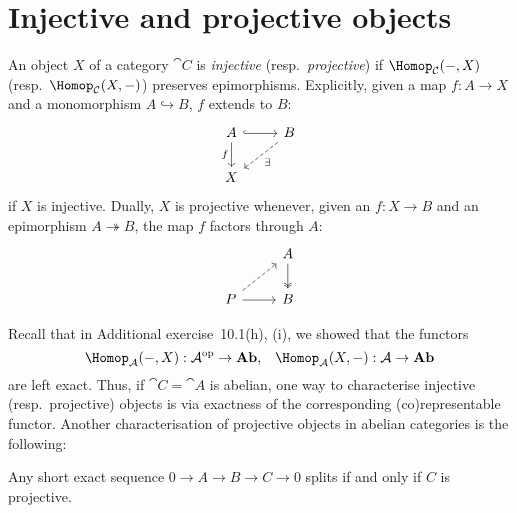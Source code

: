 \documentclass[../main.tex]{subfiles}
\begin{document}
\section{Injective and projective objects}

\begin{defn}
    An object \(X\) of a category \(\cat C\) is \emph{injective} (resp.~\emph{projective}) if $\Hom[\cat C](-, X)$ (resp.~$\Hom[\cat C](X,-)$) preserves epimorphisms. Explicitly, given a map $f\colon A\to X$ and a monomorphism $A\hookrightarrow B$, $f$ extends to $B$:
    \[\begin{tikzcd}
    	A & B \\
    	X
    	\arrow[hook, from=1-1, to=1-2]
    	\arrow["f"', from=1-1, to=2-1]
    	\arrow["\exists", dashed, from=1-2, to=2-1]
    \end{tikzcd}\] if $X$ is injective.
    Dually, $X$ is projective whenever, given an $f\colon X\to B$ and an epimorphism $A\twoheadrightarrow B$, the map $f$ factors through $A$:
    \[\begin{tikzcd}
    	& A \\
    	P & B
    	\arrow[two heads, from=1-2, to=2-2]
    	\arrow[dashed, from=2-1, to=1-2]
    	\arrow[from=2-1, to=2-2]
    \end{tikzcd}\]
\end{defn}

Recall that in Additional exercise~10.1(h), (i), we showed that the functors
\[\Hom[\cat A](-, X)\colon \cat A\opp \to \catAbelianGroup\text{,} \quad \Hom[\cat A](X, -)\colon \cat A\to \catAbelianGroup\]
are left exact.
Thus, if $\cat C = \cat A$ is abelian, one way to characterise injective (resp.~projective) objects is via exactness of the corresponding (co)representable functor. Another characterisation of projective objects in abelian categories is the following:
\begin{exc}
    Any short exact sequence $0\to A \to B \to C \to 0$ splits if and only if $C$ is projective.
\end{exc}
\end{document}
